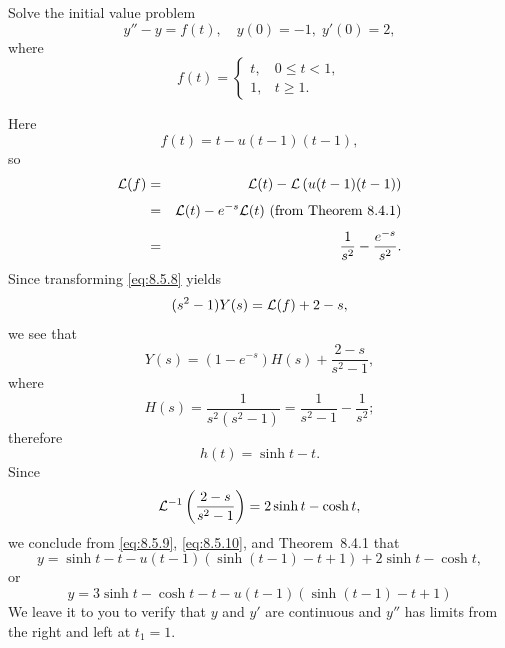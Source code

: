 \setcounter{example}{2}
\setcounter{equation}{7}
\begin{example}
  \label{example:8.5.3}\rm \space Solve the initial value problem
  \begin{equation}
    \label{eq:8.5.8}y''-y=f(t),\quad y(0)=-1,\;y'(0)=2,
  \end{equation}
  where
  \[
    f(t)=\left\{
    \begin{array}{cl}
      t, & 0\le t<1, \\
      1, & t\ge1.
    \end{array}\right.
  \]
\end{example}
\setcounter{equation}{8}
\begin{examplesolution}
\solution Here
\[
  f(t)=t-u(t-1)(t-1),
\]
so
\begin{eqnarray*}
  {\cal L}(f) & = & {\cal L}(t)-{\cal L}\left(u(t-1)(t-1)\right)                            \\[1\jot]
              & = & {\cal L}(t)-e^{-s}{\cal L}(t)\mbox{ (from Theorem~8.4.1)} \\[1\jot]
              & = & \frac{1}{s^{2}}-\frac{e^{-s}}{s^{2}}.
\end{eqnarray*}
Since transforming \eqref{eq:8.5.8} yields
\[
  (s^{2}-1)Y(s)={\cal L}(f)+2-s,
\]
we see that
\begin{equation}
  \label{eq:8.5.9}Y(s)=(1-e^{-s})H(s)+\frac{2-s}{s^{2}-1},
\end{equation}
where
\[
  H(s)=\frac{1}{s^{2}(s^{2}-1)}=\frac{1}{s^{2}-1}-\frac{1}{s^{2}};
\]
therefore
\begin{equation}
  \label{eq:8.5.10}h(t)=\sinh t-t.
\end{equation}
Since
\[
  {\cal L}^{-1}\left(\frac{2-s}{s^{2}-1}\right)=2\sinh t-\cosh t,
\]
we conclude from \eqref{eq:8.5.9}, \eqref{eq:8.5.10}, and Theorem~8.4.1 that
\[
  y=\sinh t-t-u(t-1)\left(\sinh(t-1)-t+1\right)+2\sinh t- \cosh t,
\]
or
\begin{equation}
  \label{eq:8.5.11}y=3\sinh t-\cosh t-t-u(t-1)\left(\sinh(t-1)-t+1\right)
\end{equation}
We leave it to you to verify that $y$ and $y'$ are continuous and $y''$ has limits from the right
and left at $t_{1}=1$.
\end{examplesolution}

